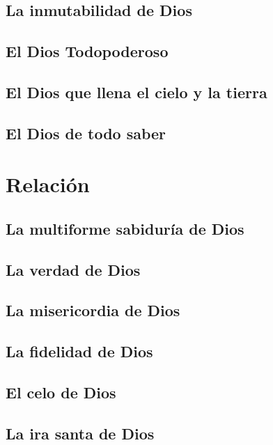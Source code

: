 \chapter[Inmutable]{La inmutabilidad de Dios}

\chapter[Omnipotente]{El Dios Todopoderoso}

\chapter[Omnipresente]{El Dios que llena el cielo y la tierra}

\chapter[Omnisciente]{El Dios de todo saber}

\part{Relación}
\chapter[Sabiduría]{La multiforme sabiduría de Dios}

\chapter[Verdadero]{La verdad de Dios}

\chapter[Misericordioso]{La misericordia de Dios}

\chapter[Fiel]{La fidelidad de Dios}

\chapter[Celo]{El celo de Dios}

\chapter[Ira santa]{La ira santa de Dios}

